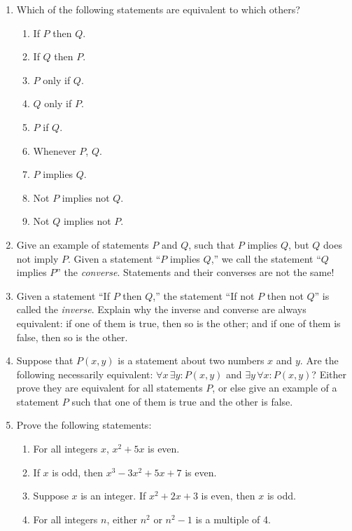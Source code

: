 \documentclass[12pt]{article}
\begin{document}
\begin{enumerate}
  \item Which of the following statements are equivalent to which others?
  \begin{enumerate}
    \item If $P$ then $Q$.
    \item If $Q$ then $P$.
    \item $P$ only if $Q$.
    \item $Q$ only if $P$.
    \item $P$ if $Q$.
    \item Whenever $P$, $Q$.
    \item $P$ implies $Q$.
    \item Not $P$ implies not $Q$.
    \item Not $Q$ implies not $P$.
  \end{enumerate}

  \item Give an example of statements $P$ and $Q$, such that $P$ implies $Q$, 
  but $Q$ does not imply $P$. Given a statement ``$P$ implies $Q$,'' 
  we call the statement ``$Q$ implies $P$'' the \textit{converse}. 
  Statements and their converses are not the same!

  \item Given a statement ``If $P$ then $Q$,'' the statement ``If not $P$ then not $Q$'' 
  is called the \textit{inverse}. Explain why the inverse and converse are always equivalent: 
  if one of them is true, then so is the other; and if one of them is false, then so is the other.

  \item Suppose that $P(x,y)$ is a statement about two numbers $x$ and $y$. 
  Are the following necessarily equivalent: 
  $\forall x \, \exists y : P(x,y)$ and $\exists y \, \forall x : P(x,y)$? 
  Either prove they are equivalent for all statements $P$, 
  or else give an example of a statement $P$ such that one of them is true and the other is false.

  \item Prove the following statements:
  \begin{enumerate}
    \item For all integers $x$, $x^2 + 5x$ is even.
    \item If $x$ is odd, then $x^3 - 3x^2 + 5x + 7$ is even.
    \item Suppose $x$ is an integer. If $x^2 + 2x + 3$ is even, then $x$ is odd.
    \item For all integers $n$, either $n^2$ or $n^2 - 1$ is a multiple of 4.
  \end{enumerate}


\end{enumerate}
\end{document}
